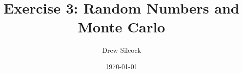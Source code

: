 \documentclass[aps,twocolumn,nobalancelastpage]{revtex4}
\begin{document}
\title{Exercise 3: Random Numbers and Monte Carlo}
\author{Drew Silcock}
\date{\today}

\maketitle






\newpage


\end{document}
